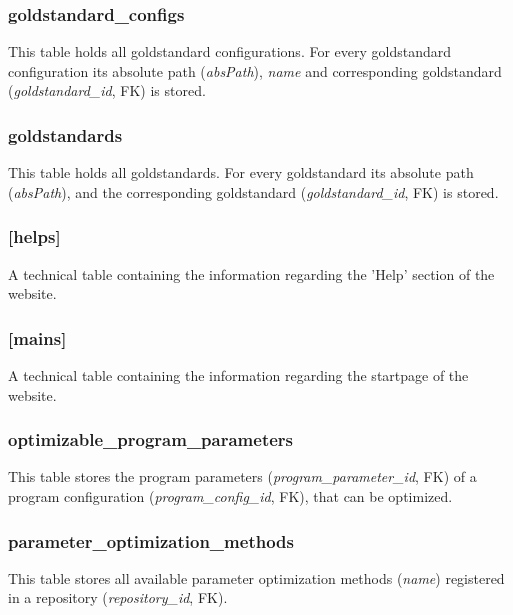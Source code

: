 		\subsubsection{goldstandard\_configs                                         } This table holds all goldstandard configurations. For every goldstandard configuration its absolute path (\textit{absPath}), \textit{name} and corresponding goldstandard (\textit{goldstandard\_id}, FK) is stored.
		
		\subsubsection{goldstandards}
		This table holds all goldstandards. For every goldstandard its absolute path (\textit{absPath}), and the corresponding goldstandard (\textit{goldstandard\_id}, FK) is stored.
		
		\subsubsection{[helps]}
	A technical table containing the information regarding the 'Help' section of the website.
	
		\subsubsection{[mains]}
	A technical table containing the information regarding the startpage of the website.
	
		\subsubsection{optimizable\_program\_parameters                               }
	This table stores the program parameters (\textit{program\_parameter\_id}, FK) of a program configuration (\textit{program\_config\_id}, FK), that can be optimized.
	
		\subsubsection{parameter\_optimization\_methods}
	This table stores all available parameter optimization methods (\textit{name}) registered in a repository (\textit{repository\_id}, FK).
	
